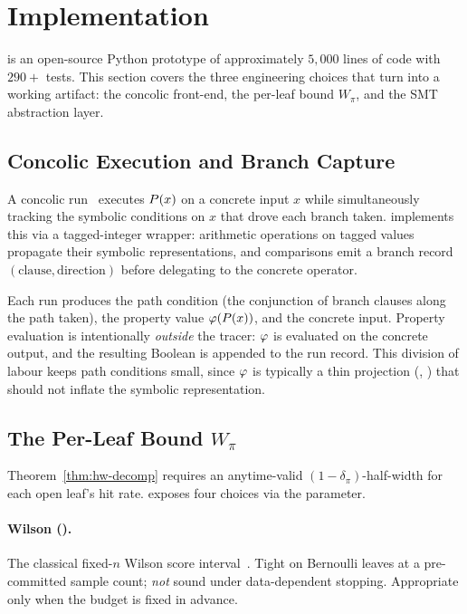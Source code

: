 \section{Implementation}\label{sec:implementation}

\toolname{} is an open-source Python prototype
of approximately $5{,}000$ lines of code with $290+$ tests.  This
section covers the three engineering choices that turn
 into a working artifact: the concolic front-end, the
per-leaf bound $W_\pi$, and the SMT abstraction layer.

\subsection{Concolic Execution and Branch Capture}\label{sec:concolic}

A concolic run~\cite{sen2005cute,godefroid2005dart} executes $P(x)$
on a concrete input $x$ while simultaneously tracking the symbolic
conditions on $x$ that drove each branch taken.  \toolname{}
implements this via a tagged-integer wrapper: arithmetic operations on
tagged values propagate their symbolic representations, and comparisons
emit a branch record $(\text{clause},\text{direction})$ before
delegating to the concrete operator.

Each run produces the path condition (the conjunction of branch clauses
along the path taken), the property value $\varphi(P(x))$, and the
concrete input.  Property evaluation is intentionally \emph{outside}
the tracer: $\varphi$ is evaluated on the concrete output, and the
resulting Boolean is appended to the run record.  This division of
labour keeps path conditions small, since $\varphi$ is typically a thin
projection (, ) that
should not inflate the symbolic representation.

\subsection{The Per-Leaf Bound $W_\pi$}\label{sec:per-leaf-bound}

Theorem~\ref{thm:hw-decomp} requires an anytime-valid
$(1-\delta_\pi)$-half-width for each open leaf's hit rate.  \toolname{}
exposes four choices via the  parameter.

\paragraph{Wilson ().}
The classical fixed-$n$ Wilson score interval~\cite{wilson1927}.  Tight
on Bernoulli leaves at a pre-committed sample count; \emph{not} sound
under data-dependent stopping.  Appropriate only when the budget is
fixed in advance.


